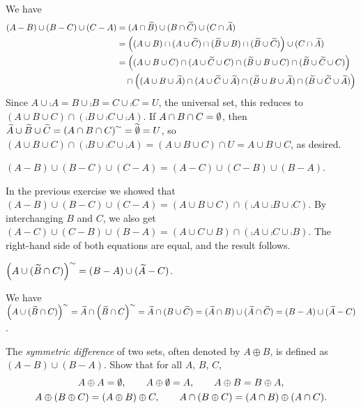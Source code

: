 \begin{solution}
We have
\[
\begin{aligned}
    (A-B)\cup(B-C)\cup(C-A) &= (A\cap \widetilde{B})\cup(B\cap \widetilde{C})\cup(C\cap\widetilde{A})\\
    &= \left((A\cup B) \cap (A\cup\widetilde{C})\cap (\widetilde{B} \cup B)\cap (\widetilde{B} \cup \widetilde{C})\right)\cup(C\cap\widetilde{A})\\
    &= \left((A\cup B\cup C) \cap (A\cup\widetilde{C}\cup C)\cap (\widetilde{B} \cup B\cup C)\cap (\widetilde{B} \cup \widetilde{C}\cup C)\right)\\
    & \quad \cap\left((A\cup B\cup\widetilde{A}) \cap (A\cup\widetilde{C}\cup\widetilde{A})\cap (\widetilde{B} \cup B\cup\widetilde{A})\cap (\widetilde{B} \cup \widetilde{C}\cup\widetilde{A})\right)\\
\end{aligned}
\]
Since $A\cup\comp A = B\cup\comp B =C\cup\comp C= U$, the universal set, this reduces to
$(A\cup B\cup C) \cap (\comp B \cup \comp C\cup\comp A)$.
If $A\cap B\cap C=\emptyset$,  then $\widetilde{A}\cup\widetilde{B}\cup\widetilde{C} = \left(A\cap B\cap C\right)^{\sim}=\widetilde{\emptyset}=U$,
so $(A\cup B\cup C) \cap (\comp B \cup \comp C\cup\comp A) = (A\cup B\cup C)\cap U = A\cup B\cup C$, as desired.
\end{solution}

\begin{exercise}
$(A-B)\cup(B-C)\cup(C-A)=(A-C)\cup(C-B)\cup(B-A)$.
\end{exercise}

\begin{solution}
In the previous exercise we showed that
$(A-B)\cup(B-C)\cup(C-A)=(A\cup B\cup C) \cap (\comp A\cup \comp B \cup \comp C)$.
By interchanging $B$ and $C$, we also get
$(A-C)\cup(C-B)\cup(B-A)=(A\cup C\cup B) \cap (\comp A\cup \comp C \cup \comp B)$.
The right-hand side of both equations are equal, and the result follows.
\end{solution}

\begin{exercise}
$\left(A\cup (\widetilde{B}\cap C)\right)^{\sim} = (B-A)\cup(\widetilde A-C)$.
\end{exercise}

\begin{solution}
We have $\left(A\cup (\widetilde{B}\cap C)\right)^{\sim} = \widetilde{A} \cap \left(\widetilde{B} \cap C\right)^{\sim}
=\widetilde{A} \cap (B \cup \widetilde{C})
=(\widetilde{A} \cap B)\cup(\widetilde{A} \cap \widetilde{C})
=(B-A)\cup(\widetilde{A} - C)$.
\end{solution}

\begin{exercise}
The \textit{symmetric difference} of two sets, often denoted by $A\oplus B$, is defined
as $(A-B)\cup(B-A)$. Show that for all $A$, $B$, $C$,
\begin{gather*}
    A\oplus A=\emptyset, \qquad A\oplus\emptyset = A, \qquad A\oplus B = B\oplus A,\\
    A\oplus(B\oplus C) = (A\oplus B)\oplus C, \qquad A\cap(B\oplus C)=(A\cap B)\oplus(A\cap C).
\end{gather*}
\end{exercise}

